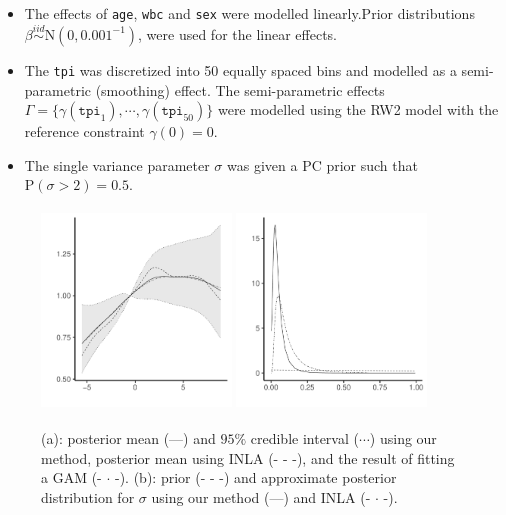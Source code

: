 \documentclass{beamer} %
\begin{document}
\begin{frame}
\begin{itemize}
\item The effects of \texttt{age}, \texttt{wbc} and \texttt{sex} were modelled linearly.Prior distributions $\beta \stackrel{iid}{\sim} \text{N}(0, 0.001^{-1})$, were used for the linear effects.
\pause
\item The \texttt{tpi} was discretized into 50 equally spaced bins and modelled as a semi-parametric (smoothing) effect. The semi-parametric effects $\Gamma = \{\gamma(\texttt{tpi}_1), \cdots, \gamma(\texttt{tpi}_{50})\}$ were modelled using the RW2 model with the reference constraint $\gamma(0) = 0$.
\pause
\item The single variance parameter $\sigma$ was given a PC prior such that $\text{P}(\sigma > 2) = 0.5$. 
\end{itemize}
\end{frame}

\begin{frame}
\begin{figure}
\centering
\includegraphics[width=0.45\textwidth,height=2.1in]{leuk_FinalPlot}
\includegraphics[width=0.45\textwidth,height=2.1in]{Leuk_PosterSigma}
\caption{(a): posterior mean (---) and $95\%$ credible interval ($\cdots$) using our method, posterior mean using INLA (- - -), and the result of fitting a GAM (- $\cdot$ -). (b): prior (- - -) and approximate posterior distribution for $\sigma$ using our method (---) and INLA (- $\cdot$ -).}
\end{figure}
\end{frame}
\end{document}
